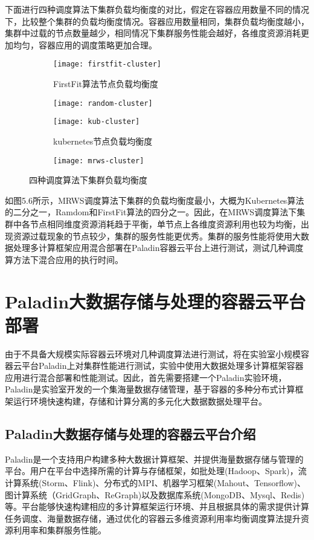 下面进行四种调度算法下集群负载均衡度的对比，假定在容器应用数量不同的情况下，比较整个集群的负载均衡度情况。容器应用数量相同，集群负载均衡度越小，集群中过载的节点数量越少，相同情况下集群服务性能会越好，各维度资源消耗更加均匀，容器应用的调度策略更加合理。

\begin{figure}[H]
	\centering%
	\begin{subfigure}{7cm}
		\texttt{[image: firstfit-cluster]}
		\caption{FirstFit算法节点负载均衡度}
	\end{subfigure}%
	\hspace{0.5cm}%
	\begin{subfigure}{7cm}
		\texttt{[image: random-cluster]}
	\end{subfigure}
	\begin{subfigure}{7cm}
		\texttt{[image: kub-cluster]}
		\caption{kubernetes节点负载均衡度}
	\end{subfigure}%
	\hspace{0.5cm}%
	\begin{subfigure}{7cm}
		\texttt{[image: mrws-cluster]}
	\end{subfigure}
	\caption{四种调度算法下集群负载均衡度}	
\end{figure}

如图5.6所示，MRWS调度算法下集群的负载均衡度最小，大概为Kubernetes算法的二分之一，Ramdom和FirstFit算法的四分之一。因此，在MRWS调度算法下集群中各节点相同维度资源消耗趋于平衡，单节点上各维度资源利用也较为均衡，出现资源过载现象的节点较少，集群的服务性能更优秀。集群的服务性能将使用大数据处理多计算框架应用混合部署在Paladin容器云平台上进行测试，测试几种调度算方法下混合应用的执行时间。

\section{Paladin大数据存储与处理的容器云平台部署}
由于不具备大规模实际容器云环境对几种调度算法进行测试，将在实验室小规模容器云平台Paladin上对集群性能进行测试，实验中使用大数据处理多计算框架容器应用进行混合部署和性能测试。因此，首先需要搭建一个Paladin实验环境，Paladin是实验室开发的一个集海量数据存储管理，基于容器的多种分布式计算框架运行环境快速构建，存储和计算分离的多元化大数据数据处理平台。
\subsection{Paladin大数据存储与处理的容器云平台介绍}
Paladin是一个支持用户构建多种大数据计算框架、并提供海量数据存储与管理的平台。用户在平台中选择所需的计算与存储框架，如批处理(Hadoop、Spark)，流计算系统(Storm、Flink)、分布式的MPI、机器学习框架(Mahout、Tensorflow)、图计算系统（GridGraph、ReGraph)以及数据库系统(MongoDB、Mysql、Redis)等。平台能够快速构建相应的多计算框架运行环境、并且根据具体的需求提供计算任务调度、海量数据存储，通过优化的容器云多维资源利用率均衡调度算法提升资源利用率和集群服务性能。

